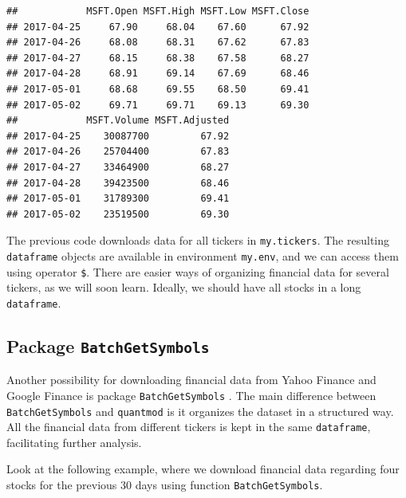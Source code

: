 \documentclass[11pt,]{book}
\newenvironment{Shaded}{\begin{snugshade}}{\end{snugshade}}
\newcommand{\KeywordTok}[1]{\textcolor[rgb]{0.27,0.27,0.27}{\textbf{#1}}}
\newcommand{\CommentTok}[1]{\textcolor[rgb]{0.56,0.35,0.01}{\textit{#1}}}
\newcommand{\OperatorTok}[1]{\textcolor[rgb]{0.81,0.36,0.00}{\textbf{#1}}}
\newcommand{\NormalTok}[1]{#1}
\begin{document}
\begin{Shaded}
\end{Shaded}

\begin{verbatim}
##            MSFT.Open MSFT.High MSFT.Low MSFT.Close
## 2017-04-25     67.90     68.04    67.60      67.92
## 2017-04-26     68.08     68.31    67.62      67.83
## 2017-04-27     68.15     68.38    67.58      68.27
## 2017-04-28     68.91     69.14    67.69      68.46
## 2017-05-01     68.68     69.55    68.50      69.41
## 2017-05-02     69.71     69.71    69.13      69.30
##            MSFT.Volume MSFT.Adjusted
## 2017-04-25    30087700         67.92
## 2017-04-26    25704400         67.83
## 2017-04-27    33464900         68.27
## 2017-04-28    39423500         68.46
## 2017-05-01    31789300         69.41
## 2017-05-02    23519500         69.30
\end{verbatim}

The previous code downloads data for all tickers in \texttt{my.tickers}.
The resulting \texttt{dataframe} objects are available in environment
\texttt{my.env}, and we can access them using operator \texttt{\$}.
There are easier ways of organizing financial data for several tickers,
as we will soon learn. Ideally, we should have all stocks in a long
\texttt{dataframe}.

\subsection{\texorpdfstring{Package
\texttt{BatchGetSymbols}}{Package BatchGetSymbols}}\label{package-batchgetsymbols}

Another possibility for downloading financial data from Yahoo Finance
and Google Finance is package \texttt{BatchGetSymbols}
\citep{BatchGetSymbols}. The main difference between
\texttt{BatchGetSymbols} and \texttt{quantmod} is it organizes the
dataset in a structured way. All the financial data from different
tickers is kept in the same \texttt{dataframe}, facilitating further
analysis. 

Look at the following example, where we download financial data
regarding four stocks for the previous 30 days using function
\texttt{BatchGetSymbols}. 
\end{document}
